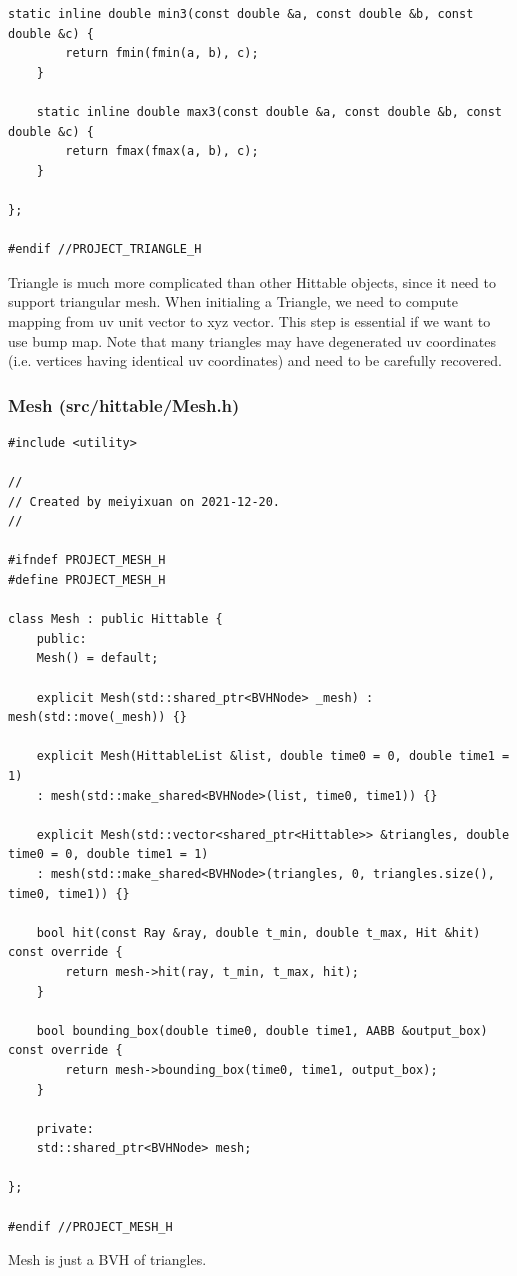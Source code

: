 \documentclass[utf8]{article}
\begin{document}
\begin{lstlisting}[style=CStyle]
	static inline double min3(const double &a, const double &b, const double &c) {
		return fmin(fmin(a, b), c);
	}
	
	static inline double max3(const double &a, const double &b, const double &c) {
		return fmax(fmax(a, b), c);
	}
	
};

#endif //PROJECT_TRIANGLE_H

\end{lstlisting}
Triangle is much more complicated than other Hittable objects, since it need to support triangular mesh. When initialing a Triangle, we need to compute mapping from uv unit vector to xyz vector. This step is essential if we want to use bump map. Note that many triangles may have degenerated uv coordinates (i.e. vertices having identical uv coordinates) and need to be carefully recovered.

\subsubsection{Mesh (src/hittable/Mesh.h)}
\begin{lstlisting}[style=CStyle]
#include <utility>

//
// Created by meiyixuan on 2021-12-20.
//

#ifndef PROJECT_MESH_H
#define PROJECT_MESH_H

class Mesh : public Hittable {
	public:
	Mesh() = default;
	
	explicit Mesh(std::shared_ptr<BVHNode> _mesh) : mesh(std::move(_mesh)) {}
	
	explicit Mesh(HittableList &list, double time0 = 0, double time1 = 1)
	: mesh(std::make_shared<BVHNode>(list, time0, time1)) {}
	
	explicit Mesh(std::vector<shared_ptr<Hittable>> &triangles, double time0 = 0, double time1 = 1)
	: mesh(std::make_shared<BVHNode>(triangles, 0, triangles.size(), time0, time1)) {}
	
	bool hit(const Ray &ray, double t_min, double t_max, Hit &hit) const override {
		return mesh->hit(ray, t_min, t_max, hit);
	}
	
	bool bounding_box(double time0, double time1, AABB &output_box) const override {
		return mesh->bounding_box(time0, time1, output_box);
	}
	
	private:
	std::shared_ptr<BVHNode> mesh;
	
};

#endif //PROJECT_MESH_H

\end{lstlisting}
Mesh is just a BVH of triangles.
\end{document}
